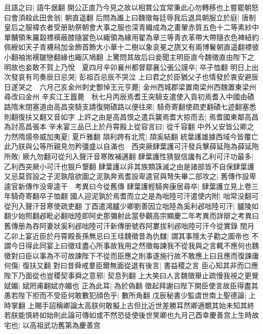 且語之曰|{
	語牛倨翻}
開公正直乃今見之故以相賞公宜常秉此心勿轉移也上嘗罷朝怒曰會須殺此田舍翁|{
	朝直遥翻}
后問為誰上曰魏徵每廷辱我后退具朝服立於庭|{
	唐制皇后之服褘衣者受册助祭朝會大事之服也深青織成為之畫翬赤質五色十二等素紗中單黼領朱羅縠褾襈蔽膝隨裳色以緅領為緣用翟為章三等青衣革帶大帶隨衣色裨紐約佩綬如天子青襪舄加金飾首飾大小華十二樹以象衮冕之旒又有兩博鬢朝直遥翻褾彼小翻袖耑襈皺戀翻緣也緅仄鳩翻}
上驚問其故后曰妾聞主明臣直今魏徵直由陛下之明故也妾敢不賀上乃悅　夏四月辛卯襄州都督鄒襄公張公謹卒|{
	卒子恤翻}
明日上出次發哀有司奏辰日忌哭|{
	彭祖百忌辰不哭泣}
上曰君之於臣猶父子也情發於衷安避辰日遂哭之　六月己亥金州刺史酆悼王元亨薨|{
	金州西城郡梁置南梁州西魏置東梁州尋改曰金州}
辛亥江王囂薨　秋七月丙辰焉耆王突騎支遣使入貢初焉耆入中國由磧路隋末閉塞道由高昌突騎支請復開磧路以便往來|{
	騎奇寄翻使疏吏翻磧七迹翻塞悉則翻復扶又翻又音如字}
上許之由是高昌恨之遣兵襲焉耆大掠而去|{
	焉耆國東鄰高昌為討高昌張本}
辛未宴三品已上於丹霄殿上從容言曰|{
	從千容翻}
中外乂安皆公卿之力然隋煬帝威加夷夏|{
	夏戶雅翻}
頡利跨有北荒|{
	頡奚結翻}
統葉護雄據西域今皆覆亡此乃朕與公等所親見勿矜彊盛以自滿也　西突厥肆葉護可汗發兵擊薛延陁為薛延陁所敗|{
	厥九勿翻可從刋入聲汗音寒敗補邁翻}
肆葉護性猜狠信讒有乙利可汗功最多|{
	乙利西突厥小可汗也狠戶墾翻}
肆葉護以非其族類誅滅之由是諸部皆不自保肆葉護又忌莫賀設之子泥孰陰欲圖之泥孰奔焉耆設卑逵官與弩失畢二部攻之|{
	舊傳作設卑逵官新傳作没卑逵干　考異曰今從舊傳}
肆葉護輕騎奔康居尋卒|{
	肆葉護立見上卷三年騎奇寄翻卒子恤翻}
國人迎泥孰於焉耆而立之是為咄陸可汗遣使内附|{
	咄常没翻可從刋入聲汗音寒使疏吏翻}
丁酉遣鴻臚少卿劉善因立咄陸為奚利邲咄陸可汗|{
	臚陵如翻少始照翻邲毗必翻咄陸即阿史那彌射此當參觀高宗顯慶二年考異而詳辯之考異曰舊傳册為吞阿妻狀奚利邲咄陸可汗新傳册號吞阿婁拔利邲咄陸可汗今從實錄}
閏月乙卯上宴近臣於丹霄殿長孫無忌曰王珪魏徵昔為仇讎|{
	謂其事隱太子勸之圖帝也}
不謂今日得此同宴上曰徵珪盡心所事故我用之然徵每諫我不從我與之言輒不應何也魏徵對曰臣以事為不可故諫陛下不從而臣應之則事遂施行故不敢應上曰且應而復諫庸何傷|{
	復扶又翻}
對曰昔舜戒羣臣爾無面從退有後言|{
	書益稷之言}
臣心知其非而口應陛下乃面從也豈稷契事舜之意邪|{
	契息列翻}
上大笑曰人言魏徵舉止疏慢我視之更覺娬媚|{
	娬罔甫翻娬亦媚也}
正為此耳|{
	為於偽翻}
徵起拜謝曰陛下開臣使言故臣得盡其愚若陛下拒而不受臣何敢數犯顔色乎|{
	數所角翻}
戊辰秘書少監虞世南上聖德論|{
	上時掌翻}
上賜手詔稱卿論太高朕何敢擬上古但比近世差勝耳然卿適覩其始未知其終若朕能慎終如始則此論可傳如或不然恐徒使後世笑卿也九月己酉幸慶善宫上生時故宅也|{
	以高祖武功舊第為慶善宫}


